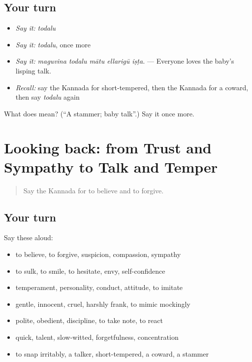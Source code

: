\subsection*{Your turn}
\begin{itemize}
\raggedright
  \item \emph{Say it:} \emph{todalu}
  \item \emph{Say it:} \emph{todalu}, once more
  \item \emph{Say it:} \emph{maguvina todalu mātu ellarigū iṣṭa.} — Everyone loves the baby's lisping talk.
  \item \emph{Recall:} say the Kannada for short-tempered, then the Kannada for a coward, then say \emph{todalu} again
\end{itemize}

\begin{tcolorbox}[breakable,colback=teal!4,colframe=teal!35!black,title={Before you move on}]
What does  mean? (\textquotedblleft{}A stammer; baby talk\textquotedblright{}.) Say it once more.
\end{tcolorbox}
\section[(dialogue)]{Looking back: from Trust and Sympathy to Talk and Temper}

\label{lesson:KA-R504-review-498-504}



\begin{quote}
Say the Kannada for to believe and to forgive.
\end{quote}

\subsection*{Your turn}
Say these aloud:

\begin{itemize}
\raggedright
  \item to believe, to forgive, suspicion, compassion, sympathy
  \item to sulk, to smile, to hesitate, envy, self-confidence
  \item temperament, personality, conduct, attitude, to imitate
  \item gentle, innocent, cruel, harshly frank, to mimic mockingly
  \item polite, obedient, discipline, to take note, to react
  \item quick, talent, slow-witted, forgetfulness, concentration
  \item to snap irritably, a talker, short-tempered, a coward, a stammer
\end{itemize}

